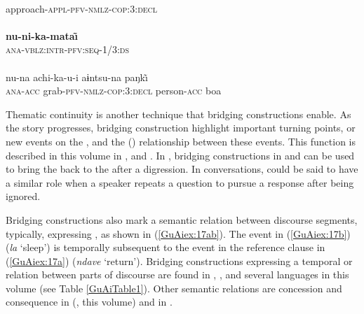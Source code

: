 \documentclass[output=paper]{LSP/langsci}
\begin{document}
\begin{exe}
\ex \label{GuAiex:36ac}
\begin{xlist}
\ex \label{GuAiex:36a}
\gll \underline{}\\
 approach-\textsc{appl-pfv-nmlz-cop:3:decl}\\
\glt {} \\
\ex \label{GuAiex:36b}
\gll  \textbf{nu-ni-ka-mata\~\i}\\
\textsc{ana-vblz:intr}{}-\textsc{pfv:seq-1/3:ds}\\
\glt {}\\
\ex \label{GuAiex:36c}
\gll  nu-na         achi-ka-u-i                         aɨntsu-na   paŋk\~\i\\
\textsc{ana-acc}   grab-\textsc{pfv-nmlz-cop:3:decl}   person-\textsc{acc}   boa\\
\glt {}
\end{xlist}
\end{exe}


Thematic continuity is another  technique that bridging constructions enable. As the story progresses, bridging construction highlight important turning points, or new events on the , and the () relationship between these events. This function is described in this volume in ,  and . In , bridging constructions in  and  can be used to bring the  back to the  after a digression. In  conversations,  could be said to have a similar role when a speaker repeats a question to pursue a response after being ignored.

Bridging constructions also mark a semantic relation between discourse segments, typically, expressing , as shown in (\ref{GuAiex:17ab}). The event in (\ref{GuAiex:17b}) (\textit{la} `sleep') is temporally subsequent to the event in the reference clause in (\ref{GuAiex:17a}) (\textit{ndave} `return'). Bridging constructions expressing a temporal or  relation between parts of discourse are found in  \citep[][314]{bromley81},  \citep[][516]{kasia17}, and several languages in this volume (see Table \ref{GuAiTable1}). Other semantic relations are concession and consequence in  (\citeauthor{aiton18}, this volume) and in  \citep[][499--502]{overall17}. 
\end{document}
